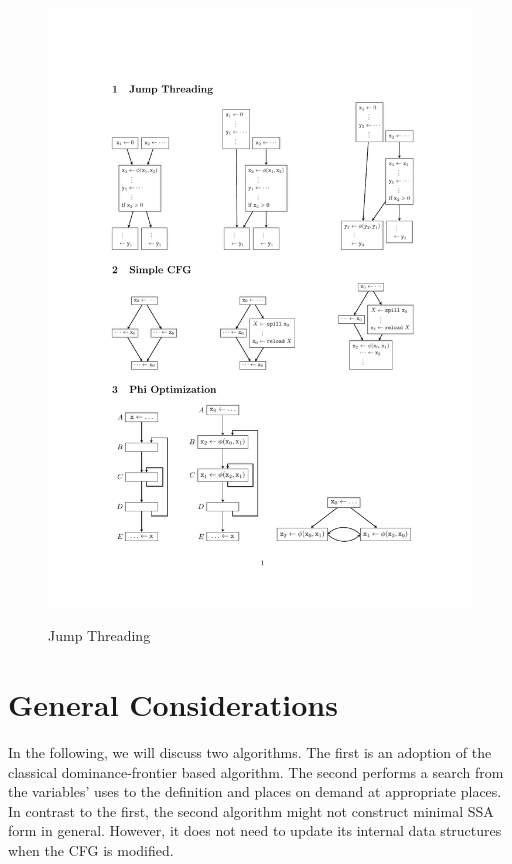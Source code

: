 \begin{figure}[htbp]
\begin{center}
{			\includegraphics{jump_thread_repair.pdf}
		}
	\end{center}
	\caption{Jump Threading}
	\label{fig:threading}
\end{figure}


\section{General Considerations}
In the following, we will discuss two algorithms.
The first is an adoption of the classical dominance-frontier based algorithm.
The second performs a search from the variables' uses to the definition and places \phifuns on demand at appropriate places. 
In contrast to the first, the second algorithm might not construct minimal SSA form in general.
However, it does not need to update its internal data structures when the CFG is modified. 

